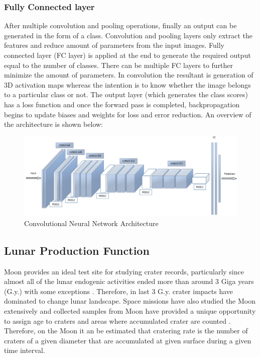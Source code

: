 \documentclass[11pt]{article}
\begin{document}
\subsubsection{Fully Connected layer}
After multiple convolution and pooling operations, finally an output can be generated in the form of a class. Convolution and pooling layers only extract the features and reduce amount of parameters from the input images. Fully connected layer (FC layer) is applied at the end to generate the required output equal to the number of classes. There can be multiple FC layers to further minimize the amount of parameters. In convolution the resultant is generation of 3D activation maps whereas the intention is to know whether the image belongs to a particular class or not. The output layer (which generates the class scores) has a loss function and once the forward pass is completed, backpropagation begins to update biases and weights for loss and error reduction. An overview of the architecture is shown below:

\begin{figure}[H]
	\centering
	\includegraphics[width=\linewidth]{files/cnn_architecture/arch.png}
	\caption{Convolutional Neural Network Architecture \cite{2016face}}
	\label{fig: CNN architecture}
\end{figure}



\subsection{Lunar Production Function}
Moon provides an ideal test site for studying crater records, particularly since almost all of the lunar endogenic activities ended more than around 3 Giga years (G.y.) with some exceptions \cite{hiesinger2000ages}. Therefore, in last 3 G.y. crater impacts have dominated to change lunar landscape. Space missions have also studied the Moon extensively and collected samples from Moon have provided a unique opportunity to assign age to craters and areas where accumulated crater are counted \cite{stoffler2001stratigraphy}. Therefore, on the Moon it an be estimated that cratering rate is the number of craters of a given diameter that are accumulated at given surface during a given time interval.
\end{document}
